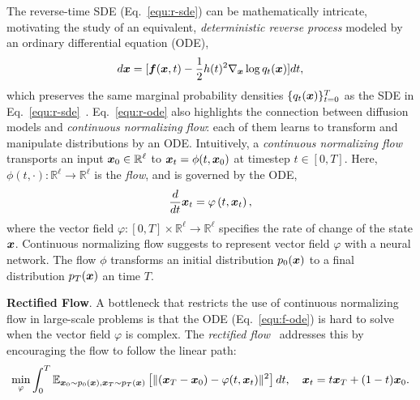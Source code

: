 The reverse-time SDE (Eq.~\ref{equ:r-sde}) can be mathematically intricate, motivating the study of an equivalent, \emph{deterministic reverse process} modeled by an ordinary differential equation (ODE),
%
\begin{align}
    d{\bm{x}} = [{\bm{f}}({\bm{x}},t)-\frac{1}{2}h(t)^2\nabla_{\bm{x}}\log q_t({\bm{x}})]dt,\label{equ:r-ode}
\end{align}
%
which  preserves the same marginal probability densities $\{q_t({\bm{x}})\}_{t=0}^T$ as the SDE in Eq.~\ref{equ:r-sde}~\cite{song2021score}.
%
%
Eq.~\ref{equ:r-ode} also highlights the connection between diffusion models and \emph{continuous normalizing flow}: each of them learns to transform and manipulate distributions by an ODE. Intuitively, a {\em continuous normalizing flow} transports an input ${\bm{x}}_0\in \mathbb{R}^\ell$ to ${\bm{x}}_t=\phi(t, {\bm{x}}_0)$ at timestep $t\in[0,T]$.
%
Here, $\phi(t, \cdot):\mathbb{R}^\ell\rightarrow\mathbb{R}^\ell$ is the  \emph{flow}, and is governed by the ODE,
%
\begin{align}
    \frac{d}{dt}{\bm{x}}_t = \varphi\left(t, {\bm{x}}_t\right),\label{equ:f-ode}
\end{align}
%
where the vector field $\varphi: [0,T]\times \mathbb{R}^\ell\rightarrow \mathbb{R}^\ell$ specifies the  rate of
change of the state ${\bm{x}}$.
%
Continuous normalizing flow \citep{chen2018neural} suggests to represent vector field $\varphi$ with a neural network. The flow $\phi$ transforms an initial distribution $p_0({\bm{x}})$ to a final distribution $p_T({\bm{x}})$ an time $T$.


\textbf{Rectified Flow}. A bottleneck that restricts the use of continuous normalizing flow in large-scale problems is that the ODE (Eq.~\ref{equ:f-ode})
is hard to solve when the vector field $\varphi$ is complex.  The {\em rectified flow}~\cite{liu2022flow} addresses this by encouraging the flow to follow the linear path:
\begin{align}
    \min_\varphi \int_0^T \mathbb{E}_{\vx_0\sim p_0(\vx),\vx_T\sim p_T(\vx)}\left[\|(\vx_T-\vx_0)-\varphi(t, \vx_t)\|^2\right]dt, \ \ \ \vx_t = t\vx_T + (1-t)\vx_0.\label{equ:rf}
\end{align}

